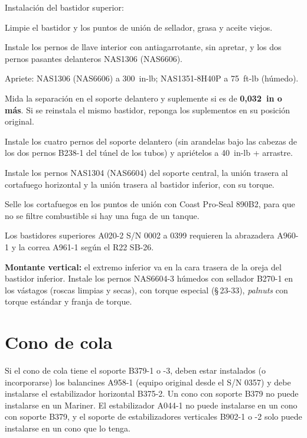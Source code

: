 Instalación del bastidor superior:
\begin{pasos}
\item Limpie el bastidor y los puntos de unión de sellador, grasa y aceite viejos.
\item Instale los pernos de llave interior con antiagarrotante, sin apretar, y los dos pernos pasantes delanteros NAS1306 (NAS6606).
\item Apriete: NAS1306 (NAS6606) a 300~in-lb; NAS1351-8H40P a 75~ft-lb (húmedo).
\item Mida la separación en el soporte delantero y suplemente si es de \textbf{0,032~in o más}. Si se reinstala el mismo bastidor, reponga los suplementos en su posición original.
\item Instale los cuatro pernos del soporte delantero (sin arandelas bajo las cabezas de los dos pernos B238-1 del túnel de los tubos) y apriételos a 40~in-lb + arrastre.
\item Instale los pernos NAS1304 (NAS6604) del soporte central, la unión trasera al cortafuego horizontal y la unión trasera al bastidor inferior, con su torque.
\item Selle los cortafuegos en los puntos de unión con Coast Pro-Seal 890B2, para que no se filtre combustible si hay una fuga de un tanque.
\end{pasos}

\begin{nota}
Los bastidores superiores A020-2 S/N 0002 a 0399 requieren la abrazadera A960-1 y la correa A961-1 según el R22 SB-26.
\end{nota}

\textbf{Montante vertical:} el extremo inferior va en la cara trasera de la oreja del bastidor inferior. Instale los pernos NAS6604-3 húmedos con sellador B270-1 en los vástagos (roscas limpias y secas), con torque especial (\S\,23-33), \emph{palnuts} con torque estándar y franja de torque.

\section{Cono de cola}

\begin{precaucion}
Si el cono de cola tiene el soporte B379-1 o -3, deben estar instalados (o incorporarse) los balancines A958-1 (equipo original desde el S/N 0357) y debe instalarse el estabilizador horizontal B375-2. Un cono con soporte B379 no puede instalarse en un Mariner. El estabilizador A044-1 no puede instalarse en un cono con soporte B379, y el soporte de estabilizadores verticales B902-1 o -2 solo puede instalarse en un cono que lo tenga.
\end{precaucion}

